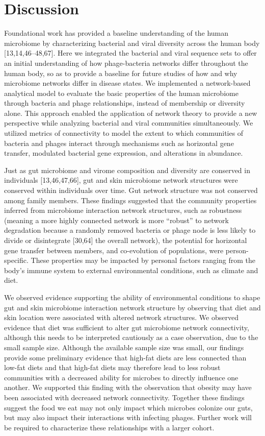 \documentclass[12pt,]{article}
\begin{document}
\section{Discussion}\label{discussion}

Foundational work has provided a baseline understanding of the human
microbiome by characterizing bacterial and viral diversity across the
human body {[}13,14,46--48,67{]}. Here we integrated the bacterial and
viral sequence sets to offer an initial understanding of how
phage-bacteria networks differ throughout the human body, so as to
provide a baseline for future studies of how and why microbiome networks
differ in disease states. We implemented a network-based analytical
model to evaluate the basic properties of the human microbiome through
bacteria and phage relationships, instead of membership or diversity
alone. This approach enabled the application of network theory to
provide a new perspective while analyzing bacterial and viral
communities simultaneously. We utilized metrics of connectivity to model
the extent to which communities of bacteria and phages interact through
mechanisms such as horizontal gene transfer, modulated bacterial gene
expression, and alterations in abundance.

Just as gut microbiome and virome composition and diversity are
conserved in individuals {[}13,46,47,66{]}, gut and skin microbiome
network structures were conserved within individuals over time. Gut
network structure was not conserved among family members. These findings
suggested that the community properties inferred from microbiome
interaction network structures, such as robustness (meaning a more
highly connected network is more ``robust'' to network degradation
because a randomly removed bacteria or phage node is less likely to
divide or disintegrate {[}30,64{]} the overall network), the potential
for horizontal gene transfer between members, and co-evolution of
populations, were person-specific. These properties may be impacted by
personal factors ranging from the body's immune system to external
environmental conditions, such as climate and diet.

We observed evidence supporting the ability of environmental conditions
to shape gut and skin microbiome interaction network structure by
observing that diet and skin location were associated with altered
network structures. We observed evidence that diet was sufficient to
alter gut microbiome network connectivity, although this needs to be
interpreted cautiously as a case observation, due to the small sample
size. Although the available sample size was small, our findings provide
some preliminary evidence that high-fat diets are less connected than
low-fat diets and that high-fat diets may therefore lead to less robust
communities with a decreased ability for microbes to directly influence
one another. We supported this finding with the observation that obesity
may have been associated with decreased network connectivity. Together
these findings suggest the food we eat may not only impact which
microbes colonize our guts, but may also impact their interactions with
infecting phages. Further work will be required to characterize these
relationships with a larger cohort.
\end{document}
